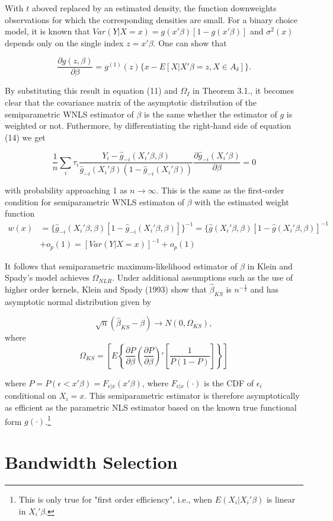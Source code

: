 \documentclass[a4paper]{article}
\begin{document}
With $t$ aboved replaced by an estimated density, the function downweights observations for which the corresponding densities are small.
For a binary choice model, it is known that $Var(Y|X = x) = g(x'\beta)[1 - g(x'\beta)]$ and $\sigma^2(x)$ depends only on the single index $z = x'\beta$. One can show that %

\[ \frac{\partial g(z,\beta)}{\partial \beta} = g^{(1)}(z)\{x - E[X|X'\beta = z, X \in A_{\delta}]\}.\]

By substituting this result in equation (11) and $\Omega_I$ in Theorem 3.1., it becomes clear that the covariance matrix of the asymptotic distribution of the semiparametric WNLS estimator of $\beta$ is the same whether the estimator of $g$ is weighted or not. Futhermore, by differentiating the right-hand side of equation (14) we get 

\[ \frac{1}{n} \sum_i \tau_{i} \frac{Y_i - \hat{g}_{-i}(X_i'\beta, \beta)}{\hat{g}_{-i}(X_i'\beta)(1 - \hat{g}_{-i}(X_i'\beta))} \frac{\partial\hat{g}_{-i}(X_i'\beta)}{\partial \beta} = 0 \]

with probability approaching 1 as $n \rightarrow \infty$. This is the same as the first-order condition for semiparametric WNLS estimaton of $\beta$ with the estimated weight function
\begin{align*}
w(x) & = \{ \hat{g}_{-i}(X_i'\beta, \beta)[ 1 - \hat{g}_{-i}(X_i'\beta, \beta)]\}^{-1} = \{ \hat{g}(X_i'\beta, \beta)[ 1 - \hat{g}(X_i'\beta, \beta)]^{-1} \\
	 & + o_p(1) = [Var(Y|X = x)]^{-1} + o_p(1)
\end{align*}

It follows that semiparametric maximum-likelihood estimator of $\beta$ in Klein and Spady's model achieves $\Omega_{NLR}$. 
Under additional assumptions such as the use of higher order kernels, Klein and Spady (1993) show that $\hat{\beta}_{KS}$ is $n^{-\frac{1}{2}}$ and has asymptotic normal distribution given by

\begin{equation}
\sqrt{n}(\hat{\beta}_{KS} - \beta) \rightarrow N(0,\Omega_{KS}),
\end{equation}
where \[ \Omega_{KS} = \left[ E \left\{ \frac{\partial P}{\partial \beta}\left(\frac{\partial P}{\partial \beta}\right)'\left[\frac{1}{P(1 - P)}\right]\right\}\right] \]

where $ P = P( \epsilon < x'\beta) = F_{\epsilon|x}(x'\beta)$, where $F_{\epsilon|x}(\cdot)$ is the CDF of $\epsilon_i$ conditional on $X_i = x$. This semiparametric estimator is therefore asymptotically as efficient as the parametric NLS estimator based on the known true functional form $g(\cdot)$.\footnote{This is only true for "first order efficiency", i.e., when $E(X_i|X_i'\beta)$ is linear in $X_i'\beta$.}

\section{Bandwidth Selection} %
\label{sec:Bandwidth Selection}


\newpage 


\end{document}
